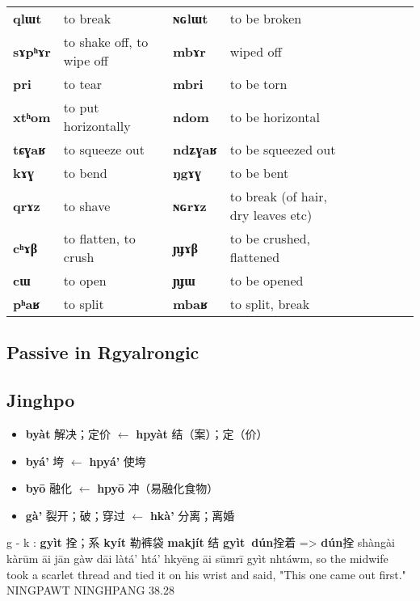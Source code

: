\documentclass[oneside,a4paper,11pt]{article}
\newcommand{\ipa}[1]{\textbf{{\phon\mbox{#1}}}} %
\newcommand{\zh}[1]{{\cn #1}}
\begin{document}
\begin{table}[h]
{\begin{tabular}{lllllllll}
\ipa{qlɯt}  &	to break	&		\ipa{ɴɢlɯt}  &		to be broken	\\
\ipa{sɤpʰɤr}  &	to shake off, to wipe off	&		\ipa{mbɤr}  &	wiped off	 	\\
 \ipa{pri}  &	 to tear	&		\ipa{mbri}  &	to be torn	 	\\
  \ipa{xtʰom}  &	 to put horizontally	&		\ipa{ndom}  &	 	to be horizontal 	\\
  \ipa{tɕɣaʁ}  &	 to squeeze out 	&		\ipa{ndʑɣaʁ}  &	 to be squeezed out	 	\\ 
   \ipa{kɤɣ}  &	 to bend 	&		\ipa{ŋgɤɣ}  &	 to be bent	 	\\ 
   \ipa{qrɤz}  &	 to shave 	&		\ipa{ɴɢrɤz}  &	 	to break (of hair, dry leaves etc) 	\\ 
   \ipa{cʰɤβ}  &	 to flatten, to crush 	&		\ipa{ɲɟɤβ}  &	to be crushed, flattened 	 	\\ 
   \ipa{cɯ}  &	 to open 	&		\ipa{ɲɟɯ}  &	 to be opened	 	\\ 
      \ipa{pʰaʁ}  &	 to split 	&		\ipa{mbaʁ}  &	 to split, break	 	\\
 \bottomrule
\end{tabular}}
\end{table}

\subsection{Passive in Rgyalrongic}
 
 
 \subsection{Jinghpo}
 \citet[78]{dai92yufa}
\begin{itemize}
\item \ipa{byàt} \zh{解决；定价} $\leftarrow$ \ipa{hpyàt} \zh{结（案）；定（价）}
\item \ipa{byá'} \zh{垮} $\leftarrow$ \ipa{hpyá'} \zh{使垮} %
\item \ipa{byō} \zh{融化} $\leftarrow$ \ipa{hpyō} \zh{冲（易融化食物）} 
\item \ipa{gà'} \zh{裂开；破；穿过} $\leftarrow$ \ipa{hkà'} \zh{分离；离婚} 
\end{itemize}

g - k : 
  \ipa{gyìt} \zh{拴；系}  \ipa{kyít}   \zh{勒裤袋}
  \ipa{makjít} \zh{结} 
    \ipa{gyìt dún}\zh{拴着} =>  \ipa{dún}\zh{拴}
shàngài kàrūm āi jān gàw dāi làtá' htá' hkyēng āi sūmrī gyìt nhtáwm, 
so the midwife took a scarlet thread and tied it on his wrist and said, "This one came out first."
NINGPAWT NINGHPANG 38.28
\end{document}

